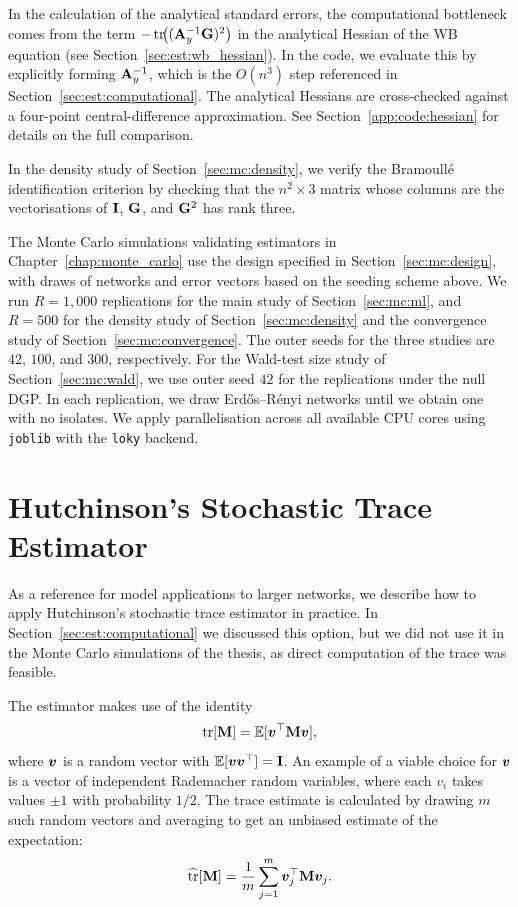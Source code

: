 In the calculation of the analytical standard errors, the computational bottleneck comes from the term $-\operatorname{tr}\!\bigl((\mathbf{A}_y^{-1}\mathbf{G})^2\bigr)$ in the analytical Hessian of the WB equation (see Section~\ref{sec:est:wb_hessian}). In the code, we evaluate this by explicitly forming $\mathbf{A}_y^{-1}$, which is the $O(n^3)$ step referenced in Section~\ref{sec:est:computational}. The analytical Hessians are cross-checked against a four-point central-difference approximation. See Section~\ref{app:code:hessian} for details on the full comparison.

In the density study of Section~\ref{sec:mc:density}, we verify the Bramoull\'e identification criterion by checking that the $n^2 \times 3$ matrix whose columns are the vectorisations of $\mathbf{I}$, $\mathbf{G}$, and $\mathbf{G}^2$ has rank three.

The Monte Carlo simulations validating estimators in Chapter~\ref{chap:monte_carlo} use the design specified in Section~\ref{sec:mc:design}, with draws of networks and error vectors based on the seeding scheme above. We run $R = 1{,}000$ replications for the main study of Section~\ref{sec:mc:ml}, and $R = 500$ for the density study of Section~\ref{sec:mc:density} and the convergence study of Section~\ref{sec:mc:convergence}. The outer seeds for the three studies are $42$, $100$, and $300$, respectively. For the Wald-test size study of Section~\ref{sec:mc:wald}, we use outer seed $42$ for the replications under the null DGP\@. In each replication, we draw Erd\H{o}s--R\'enyi networks until we obtain one with no isolates. We apply parallelisation across all available CPU cores using \texttt{joblib} with the \texttt{loky} backend.

\section{Hutchinson's Stochastic Trace Estimator}
\label{app:code:hutchinson}
As a reference for model applications to larger networks, we describe how to apply Hutchinson's stochastic trace estimator in practice. In Section~\ref{sec:est:computational} we discussed this option, but we did not use it in the Monte Carlo simulations of the thesis, as direct computation of the trace was feasible.

The estimator makes use of the identity
\begin{equation}
    \operatorname{tr}[\mathbf{M}] = \mathbb{E}[\bm{v}^\top\mathbf{M}\bm{v}],
\end{equation}
where $\bm{v}$ is a random vector with $\mathbb{E}[\bm{v}\bm{v}^\top] = \mathbf{I}$. An example of a viable choice for $\bm{v}$ is a vector of independent Rademacher random variables, where each $v_i$ takes values $\pm 1$ with probability $1/2$. The trace estimate is calculated by drawing $m$ such random vectors and averaging to get an unbiased estimate of the expectation:
\begin{equation}
    \widehat{\operatorname{tr}}[\mathbf{M}] = \frac{1}{m}\sum_{j=1}^m \bm{v}_j^\top\mathbf{M}\bm{v}_j.
\end{equation}

